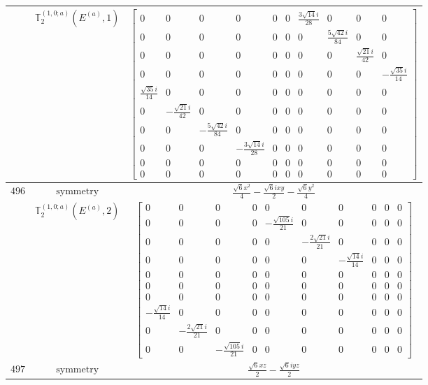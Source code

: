 \documentclass[fleqn,8pt,landscape]{jsarticle}
\begin{document}
\begin{longtable}{ccc}
$  $ & $ \mathbb{T}_{2}^{(1,0;a)}(E^{(a)},1) $ & $ \begin{bmatrix} 0 & 0 & 0 & 0 & 0 & 0 & \frac{3 \sqrt{14} i}{28} & 0 & 0 & 0 \\ 0 & 0 & 0 & 0 & 0 & 0 & 0 & \frac{5 \sqrt{42} i}{84} & 0 & 0 \\ 0 & 0 & 0 & 0 & 0 & 0 & 0 & 0 & \frac{\sqrt{21} i}{42} & 0 \\ 0 & 0 & 0 & 0 & 0 & 0 & 0 & 0 & 0 & - \frac{\sqrt{35} i}{14} \\ \frac{\sqrt{35} i}{14} & 0 & 0 & 0 & 0 & 0 & 0 & 0 & 0 & 0 \\ 0 & - \frac{\sqrt{21} i}{42} & 0 & 0 & 0 & 0 & 0 & 0 & 0 & 0 \\ 0 & 0 & - \frac{5 \sqrt{42} i}{84} & 0 & 0 & 0 & 0 & 0 & 0 & 0 \\ 0 & 0 & 0 & - \frac{3 \sqrt{14} i}{28} & 0 & 0 & 0 & 0 & 0 & 0 \\ 0 & 0 & 0 & 0 & 0 & 0 & 0 & 0 & 0 & 0 \\ 0 & 0 & 0 & 0 & 0 & 0 & 0 & 0 & 0 & 0 \end{bmatrix} $ \\ \hline
$ 496 $ & $ \text{symmetry} $ & $ \frac{\sqrt{6} x^{2}}{4} - \frac{\sqrt{6} i x y}{2} - \frac{\sqrt{6} y^{2}}{4} $ \\
$  $ & $ \mathbb{T}_{2}^{(1,0;a)}(E^{(a)},2) $ & $ \begin{bmatrix} 0 & 0 & 0 & 0 & 0 & 0 & 0 & 0 & 0 & 0 \\ 0 & 0 & 0 & 0 & - \frac{\sqrt{105} i}{21} & 0 & 0 & 0 & 0 & 0 \\ 0 & 0 & 0 & 0 & 0 & - \frac{2 \sqrt{21} i}{21} & 0 & 0 & 0 & 0 \\ 0 & 0 & 0 & 0 & 0 & 0 & - \frac{\sqrt{14} i}{14} & 0 & 0 & 0 \\ 0 & 0 & 0 & 0 & 0 & 0 & 0 & 0 & 0 & 0 \\ 0 & 0 & 0 & 0 & 0 & 0 & 0 & 0 & 0 & 0 \\ 0 & 0 & 0 & 0 & 0 & 0 & 0 & 0 & 0 & 0 \\ - \frac{\sqrt{14} i}{14} & 0 & 0 & 0 & 0 & 0 & 0 & 0 & 0 & 0 \\ 0 & - \frac{2 \sqrt{21} i}{21} & 0 & 0 & 0 & 0 & 0 & 0 & 0 & 0 \\ 0 & 0 & - \frac{\sqrt{105} i}{21} & 0 & 0 & 0 & 0 & 0 & 0 & 0 \end{bmatrix} $ \\ \hline
$ 497 $ & $ \text{symmetry} $ & $ \frac{\sqrt{6} x z}{2} - \frac{\sqrt{6} i y z}{2} $ \\

\end{longtable}
\end{document}
